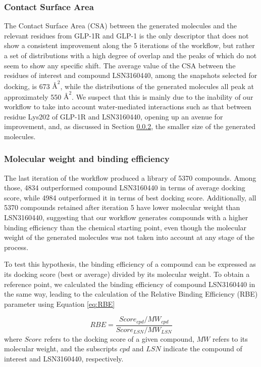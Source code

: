 \subsubsection{Contact Surface Area}
The Contact Surface Area (CSA) between the generated molecules and the relevant residues from GLP-1R and GLP-1 is the only descriptor that does not show a consistent improvement along the 5 iterations of the workflow, but rather a set of distributions with a high degree of overlap and the peaks of which do not seem to show any specific shift. The average value of the CSA between the residues of interest and compound LSN3160440, among the snapshots selected for docking, is 673 $\text{\AA}^{2}$, while the distributions of the generated molecules all peak at approximately 550 $\text{\AA}^{2}$. We suspect that this is mainly due to the inability of our workflow to take into account water-mediated interactions such as that between residue Lys202 of GLP-1R and LSN3160440, opening up an avenue for improvement, and, as discussed in Section \ref{sec:results-mw}, the smaller size of the generated molecules.

\subsubsection{Molecular weight and binding efficiency}\label{sec:results-mw}
The last iteration of the workflow produced a library of 5370 compounds. Among those, 4834 outperformed compound LSN3160440 in terms of average docking score, while 4984 outperformed it in terms of best docking score. Additionally, all 5370 compounds retained after iteration 5 have lower molecular weight than LSN3160440, suggesting that our workflow generates compounds with a higher binding efficiency than the chemical starting point, even though the molecular weight of the generated molecules was not taken into account at any stage of the process. 

To test this hypothesis, the binding efficiency of a compound can be expressed as its docking score (best or average) divided by its molecular weight. To obtain a reference point, we calculated the binding efficiency of compound LSN3160440 in the same way, leading to the calculation of the Relative Binding Efficiency (RBE) parameter using Equation \ref{eq:RBE}

\begin{equation}
\label{eq:RBE}
    RBE=\frac{Score_{cpd}/MW_{cpd}}{Score_{LSN}/MW_{LSN}}
\end{equation}
where $Score$ refers to the docking score of a given compound, $MW$ refers to its molecular weight, and the subscripts $cpd$ and $LSN$ indicate the compound of interest and LSN3160440, respectively.

